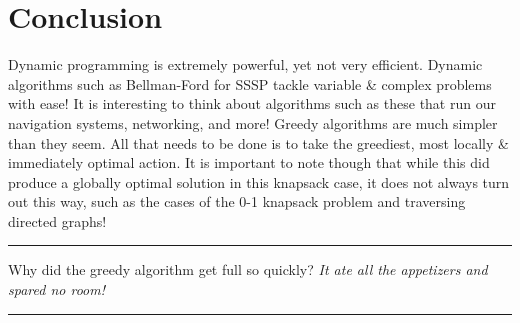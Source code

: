 \documentclass[letterpaper, 10pt]{article}
\begin{document}
\section{Conclusion}
Dynamic programming is extremely powerful, yet not very efficient. Dynamic algorithms such as Bellman-Ford for SSSP tackle variable \& complex problems with ease! It is interesting to think about algorithms such as these that run our navigation systems, networking, and more!
\newline Greedy algorithms are much simpler than they seem. All that needs to be done is to take the greediest, most locally \& immediately optimal action. It is important to note though that while this did produce a globally optimal solution in this knapsack case, it does not always turn out this way, such as the cases of the 0-1 knapsack problem and traversing directed graphs!
\\
\hrule
\vspace{.25cm}
Why did the greedy algorithm get full so quickly? \textit{It ate all the appetizers and spared no room!}
\vspace{.25cm}
\hrule
\end{document}
